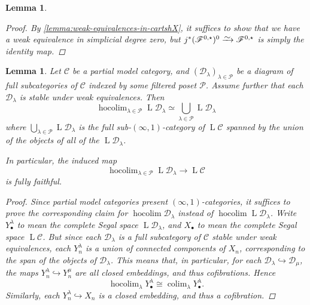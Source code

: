 \documentclass[11pt,fleqn]{article}
\theoremstyle{plain}
\newtheorem{lemma}[theorem]{Lemma}
\theoremstyle{definition}
\theoremstyle{remark}
\numberwithin{equation}{theorem}
\newcommand{\anotherbullet}{\star}
\newcommand{\congto}{\xrightarrow{\raisebox{-.5ex}[0ex][0ex]{$\sim$}}}
\DeclareMathOperator{\LL}{L}
\DeclareMathOperator{\colim}{colim}
\DeclareMathOperator{\hocolim}{hocolim}
\begin{document}
\begin{lemma}
\begin{proof}
                By \cref{lemma:weak-equivalences-in-cartshX}, it suffices to show that we have a weak equivalence in simplicial degree zero, but $j^*(\mathscr{F}^{0,\anotherbullet})^0\congto\mathscr{F}^{0,\anotherbullet}$ is simply the identity map.
            \end{proof}
        \end{lemma}

        \begin{lemma}\label{lemma:filtered-poset-colimit}
            Let $\mathcal{C}$ be a partial model category, and $(\mathcal{D}_\lambda)_{\lambda\in\mathcal{P}}$ be a diagram of full subcategories of $\mathcal{C}$ indexed by some filtered poset $\mathcal{P}$.
            Assume further that each $\mathcal{D}_\lambda$ is stable under weak equivalences.
            Then
            \[
                \hocolim_{\lambda\in\mathcal{P}} \LL{\mathcal{D}_\lambda}
                \simeq
                \bigcup_{\lambda\in\mathcal{P}} \LL{\mathcal{D}_\lambda}
            \]
            where $\bigcup_{\lambda\in\mathcal{P}} \LL{\mathcal{D}_\lambda}$ is the full sub-$(\infty,1)$-category of $\LL{\mathcal{C}}$ spanned by the union of the objects of all of the $\LL{\mathcal{D}_\lambda}$.

            In particular, the induced map
            \[
                \hocolim_{\lambda\in\mathcal{P}} \LL{\mathcal{D}_\lambda}
                \to
                \LL{\mathcal{C}}
            \]
            is fully faithful.

            \begin{proof}
                Since partial model categories present $(\infty,1)$-categories, it suffices to prove the corresponding claim for $\hocolim\mathcal{D}_\lambda$ instead of $\hocolim\LL{\mathcal{D}_\lambda}$.
                Write $Y_\bullet^\lambda$ to mean the complete Segal space $\LL{\mathcal{D}_\lambda}$, and $X_\bullet$ to mean the complete Segal space $\LL{\mathcal{C}}$.
                But since each $\mathcal{D}_\lambda$ is a full subcategory of $\mathcal{C}$ stable under weak equivalences, each $Y_n^\lambda$ is a union of connected components of $X_n$, corresponding to the span of the objects of $\mathcal{D}_\lambda$.
                This means that, in particular, for each $\mathcal{D}_\lambda\hookrightarrow\mathcal{D}_\mu$, the maps $Y_n^\lambda\hookrightarrow Y_n^\mu$ are all closed embeddings, and thus cofibrations.
                Hence
                \[
                    \hocolim_\lambda Y_\bullet^\lambda \cong \colim_\lambda Y_\bullet^\lambda.
                \]
                Similarly, each $Y_n^\lambda\hookrightarrow X_n$ is a closed embedding, and thus a cofibration.


\end{proof}
\end{lemma}
\end{document}
